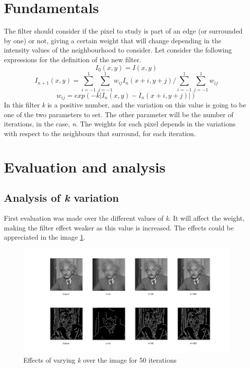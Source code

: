 \documentclass[a4paper, 10pt, conference] {article}
\begin{document}
\section{Fundamentals}
The filter should consider if the pixel to study is part of an edge (or surrounded by one) or not, giving a certain weight that will change depending in the intensity values of the neighbourhood to consider. Let consider the following expressions for the definition of the new filter.
\begin{equation}
I_{0}(x,y) = I(x,y)
\end{equation} 
\begin{equation}
I_{n+1}(x,y) = \sum\limits_{i=-1}^1\sum\limits_{j=-1}^1 w_{ij}I_{n}(x+i, y+j)/\sum\limits_{i=-1}^1\sum\limits_{j=-1}^1 w_{ij} 
\end{equation}
\begin{equation}
w_{ij} = exp(-k \left|I_{n}(x,y)-I_{n}(x+i,y+j)\right|)
\end{equation}
In this filter \textit{k} is a positive number, and the variation on this value is going to be one of the two parameters to set.
The other parameter will be the number of iterations, in the case, \textit{n}. The weights for each pixel depends in the variations with respect to the neighbours that surround, for each iteration. 

\section{Evaluation and analysis}
\subsection{Analysis of \textit{k} variation}
First evaluation was made over the different values of \textit{k}. It will affect the weight, making the filter effect weaker as this value is increased. The effects could be appreciated in the image \ref{kanalysis}. 
\begin{figure}[H]
	\centering
	\includegraphics[width=1\textwidth]{analysis_einstein_k.JPG} %
	\caption{Effects of varying \textit{k} over the image  for 50 iterations}
	\label{kanalysis}
\end{figure}
\end{document}
